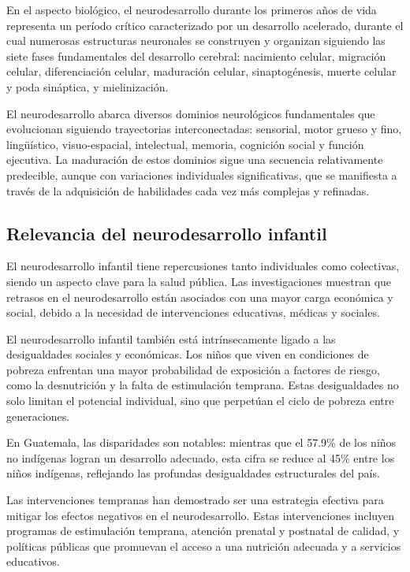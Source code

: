 \documentclass[11pt,letterpaper]{report}
\begin{document}
En el aspecto biológico, el neurodesarrollo durante los primeros años de vida
representa un período crítico caracterizado por un desarrollo acelerado, 
durante el cual numerosas estructuras neuronales se construyen y organizan 
siguiendo las siete fases fundamentales del desarrollo cerebral: nacimiento 
celular, migración celular, diferenciación celular, maduración celular, 
sinaptogénesis, muerte celular y poda sináptica, y mielinización.
\cite{Kolb7}

El neurodesarrollo abarca diversos dominios neurológicos fundamentales que 
evolucionan siguiendo trayectorias interconectadas: sensorial, motor grueso y
fino, lingüístico, visuo-espacial, intelectual, memoria, cognición social y
función ejecutiva. La maduración de estos dominios sigue una secuencia
relativamente predecible, aunque con  variaciones individuales significativas,
que se manifiesta a través de la  adquisición de habilidades cada vez más
complejas y refinadas. \cite{Nelson49}

\subsection{Relevancia del neurodesarrollo infantil}
El neurodesarrollo infantil tiene repercusiones tanto individuales como
colectivas, siendo un aspecto clave para la salud pública. Las investigaciones
muestran que retrasos en el neurodesarrollo están asociados con una mayor carga
económica y social, debido a la necesidad de intervenciones educativas, médicas
y sociales.

El neurodesarrollo infantil también está intrínsecamente ligado a las 
desigualdades sociales y económicas. Los niños que viven en condiciones de 
pobreza enfrentan una mayor probabilidad de exposición a factores de riesgo, 
como la desnutrición y la falta de estimulación temprana. Estas desigualdades 
no solo limitan el potencial individual, sino que perpetúan el ciclo de pobreza 
entre generaciones. \cite{UNICEF2023}

En Guatemala, las disparidades son notables: mientras que el 57.9\% de los
niños no indígenas logran un desarrollo adecuado, esta cifra se reduce al 45\%
entre los niños indígenas, reflejando las profundas desigualdades estructurales
del país. \cite{SESAN2022}

Las intervenciones tempranas han demostrado ser una estrategia efectiva para 
mitigar los efectos negativos en el neurodesarrollo. Estas intervenciones
incluyen programas de estimulación temprana, atención prenatal y postnatal de
calidad, y políticas públicas que promuevan el acceso a una nutrición adecuada
y a servicios educativos.
\end{document}
